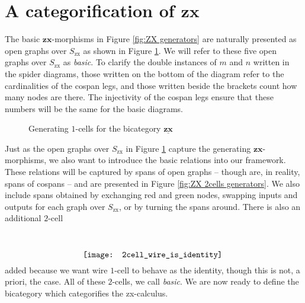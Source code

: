 \documentclass[]{amsart}
\theoremstyle{defn}
\begin{document}
\section{A categorification of $\mathbf{zx}$}
\label{sec:zx categorified}

The basic $\mathbf{zx}$-morphisms in Figure \ref{fig:ZX generators} are naturally presented as open graphs over $S_{\text{zx}}$ as shown in Figure \ref{fig:ZX 1cells generators}.  We will refer to these five open graphs over $S_{\text{zx}}$ as \emph{basic}.  To clarify the double instances of $m$ and $n$ written in the spider diagrams, those written on the bottom of the diagram refer to the cardinalities of the cospan legs, and those written beside the brackets count how many nodes are there.  The injectivity of the cospan legs ensure that these numbers will be the same for the basic diagrams.

\begin{figure}[h]
	\caption{Generating $1$-cells for the bicategory $\underline{\mathbf{zx}}$}
	\label{fig:ZX 1cells generators}
\end{figure} 

Just as the open graphs over $S_{\text{zx}}$ in Figure \ref{fig:ZX 1cells generators} capture the generating $\mathbf{zx}$-morphisms, we also want to introduce the basic relations into our framework.  These relations will be captured by spans of open graphs -- though are, in reality, spans of cospans -- and are presented in Figure \ref{fig:ZX 2cells generators}. We also include spans obtained by exchanging red and green nodes, swapping inputs and outputs for each graph over $S_{\text{zx}}$, or by turning the spans around.  There is also an additional $2$-cell
\begin{equation}
\label{eq:2cell wire is identity}
\raisebox{-2.5em}{%
	\texttt{[image: 2cell\_wire\_is\_identity]}
}
\end{equation}
added because we want wire $1$-cell to behave as the identity, though this is not, a priori, the case. All of these $2$-cells, we call \emph{basic}.  We are now ready to define the bicategory which categorifies the zx-calculus.
\end{document}
